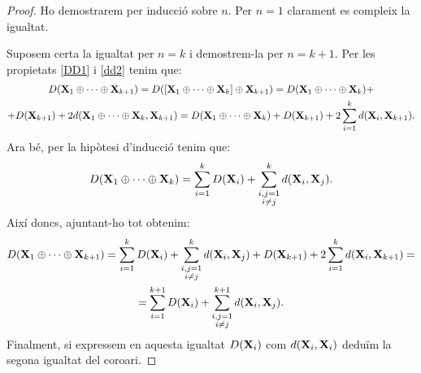 \documentclass{article}
\theoremstyle{math}
\theoremstyle{TheoremNum}
\newcommand{\0}{\ensuremath{\vb{0}}}
\newcommand{\X}{\ensuremath{\vb{X}}}
\begin{document}
\begin{proof}
    Ho demostrarem per inducció sobre $n$. Per $n=1$ clarament es compleix la igualtat.\par Suposem certa la igualtat per $n=k$ i demostrem-la per $n=k+1$. Per les propietats \ref{DD1} i \ref{dd2} tenim que:
    \begin{multline*}
        D(\X_1\oplus\cdots\oplus\X_{k+1})=D([\X_1\oplus\cdots\oplus\X_k]\oplus\X_{k+1})=D(\X_1\oplus\cdots\oplus\X_k)+\\+D(\X_{k+1})+2d(\X_1\oplus\cdots\oplus\X_k,\X_{k+1})=D(\X_1\oplus\cdots\oplus\X_k)+D(\X_{k+1})+2\sum_{i=1}^kd(\X_i,\X_{k+1}).
    \end{multline*}
    Ara bé, per la hipòtesi d'inducció tenim que:
    $$D(\X_1\oplus\cdots\oplus\X_k)=\sum_{i=1}^kD(\X_i)+\sum_{\substack{i,j=1\\i\ne j}}^kd(\X_i,\X_j).$$ Així doncs, ajuntant-ho tot obtenim:
    \begin{multline*}
        D(\X_1\oplus\cdots\oplus\X_{k+1})=\sum_{i=1}^kD(\X_i)+\sum_{\substack{i,j=1\\i\ne j}}^kd(\X_i,\X_j)+D(\X_{k+1})+2\sum_{i=1}^kd(\X_i,\X_{k+1})=\\=\sum_{i=1}^{k+1}D(\X_i)+\sum_{\substack{i,j=1\\i\ne j}}^{k+1}d(\X_i,\X_j).
    \end{multline*}
    Finalment, si expressem en aquesta igualtat $D(\X_i)$ com $d(\X_i,\X_i)$ deduïm la segona igualtat del coro\lgem ari.
\end{proof}
\end{document}
